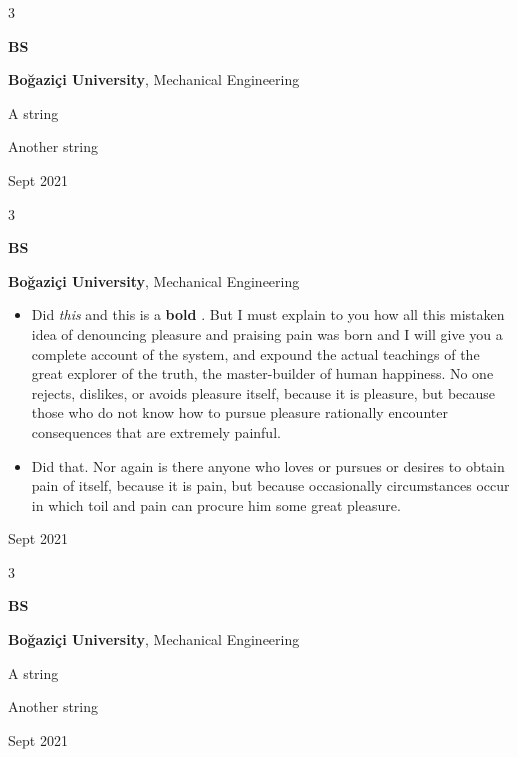 \documentclass[10pt, letterpaper]{article}
\newenvironment{summary}{
    \begin{description}[
        topsep=0.10 cm,
        parsep=0.10 cm,
        partopsep=0pt,
        itemsep=0pt,
        leftmargin=0.4 cm + 10pt
    ]
}{
    \end{description}
} %
\newenvironment{highlights}{
    \begin{itemize}[
        topsep=0.10 cm,
        parsep=0.10 cm,
        partopsep=0pt,
        itemsep=0pt,
        leftmargin=0.4 cm + 10pt
    ]
}{
    \end{itemize}
} %
\newenvironment{threecolentry}[3][]{
    \onecolentry
    \def\thirdColumn{#3}
    \setcolumnwidth{1 cm, \fill, 4.5 cm}
    \begin{paracol}{3}
    {\raggedright #2} \switchcolumn
}{
    \switchcolumn \raggedleft \thirdColumn
    \end{paracol}
    \endonecolentry
} %
\let\hrefWithoutArrow\href
\renewcommand{\href}[2]{\hrefWithoutArrow{#1}{\ifthenelse{\equal{#2}{}}{ }{#2 }\raisebox{.15ex}{\footnotesize \faExternalLink*}}}
\begin{document}
        \vspace{0.2 cm}

        \begin{threecolentry}{\textbf{BS}}{
            Sept 2021
        }
            \textbf{Boğaziçi University}, Mechanical Engineering
            \begin{summary}
                \item A string
                \item Another string
            \end{summary}
        \end{threecolentry}

        \vspace{0.2 cm}

        \begin{threecolentry}{\textbf{BS}}{
            Sept 2021
        }
            \textbf{Boğaziçi University}, Mechanical Engineering
            \begin{highlights}
                \item Did \textit{this} and this is a \textbf{bold} \href{https://example.com}{link}. But I must explain to you how all this mistaken idea of denouncing pleasure and praising pain was born and I will give you a complete account of the system, and expound the actual teachings of the great explorer of the truth, the master-builder of human happiness. No one rejects, dislikes, or avoids pleasure itself, because it is pleasure, but because those who do not know how to pursue pleasure rationally encounter consequences that are extremely painful.
                \item Did that. Nor again is there anyone who loves or pursues or desires to obtain pain of itself, because it is pain, but because occasionally circumstances occur in which toil and pain can procure him some great pleasure.
            \end{highlights}
        \end{threecolentry}

        \vspace{0.2 cm}

        \begin{threecolentry}{\textbf{BS}}{
            Sept 2021
        }
            \textbf{Boğaziçi University}, Mechanical Engineering
            \begin{summary}
                \item A string
                \item Another string
            \end{summary}
        \end{threecolentry}
\end{document}
